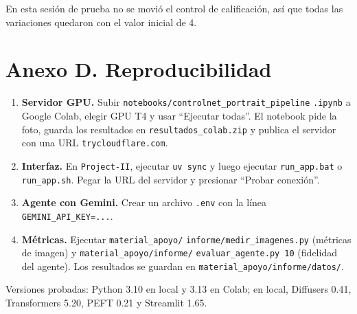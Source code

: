 \documentclass[conference]{IEEEtran}
\begin{document}
En esta sesión de prueba no se movió el control de calificación, así que todas las variaciones quedaron con el valor inicial de 4.

\section*{Anexo D. Reproducibilidad}

\begin{enumerate}
\item \textbf{Servidor GPU.} Subir \texttt{notebooks/controlnet\_portrait\_pipeline} \texttt{.ipynb} a Google Colab, elegir GPU T4 y usar ``Ejecutar todas''. El notebook pide la foto, guarda los resultados en \texttt{resultados\_colab.zip} y publica el servidor con una URL \texttt{trycloudflare.com}.
\item \textbf{Interfaz.} En \texttt{Project-II}, ejecutar \texttt{uv sync} y luego ejecutar \texttt{run\_app.bat} o \texttt{run\_app.sh}. Pegar la URL del servidor y presionar ``Probar conexión''.
\item \textbf{Agente con Gemini.} Crear un archivo \texttt{.env} con la línea \texttt{GEMINI\_API\_KEY=...}.
\item \textbf{Métricas.} Ejecutar \texttt{material\_apoyo/} \texttt{informe/medir\_imagenes.py} (métricas de imagen) y \texttt{material\_apoyo/informe/} \texttt{evaluar\_agente.py 10} (fidelidad del agente). Los resultados se guardan en \texttt{material\_apoyo/informe/datos/}.
\end{enumerate}

Versiones probadas: Python 3.10 en local y 3.13 en Colab; en local, Diffusers 0.41, Transformers 5.20, PEFT 0.21 y Streamlit 1.65.
\end{document}
